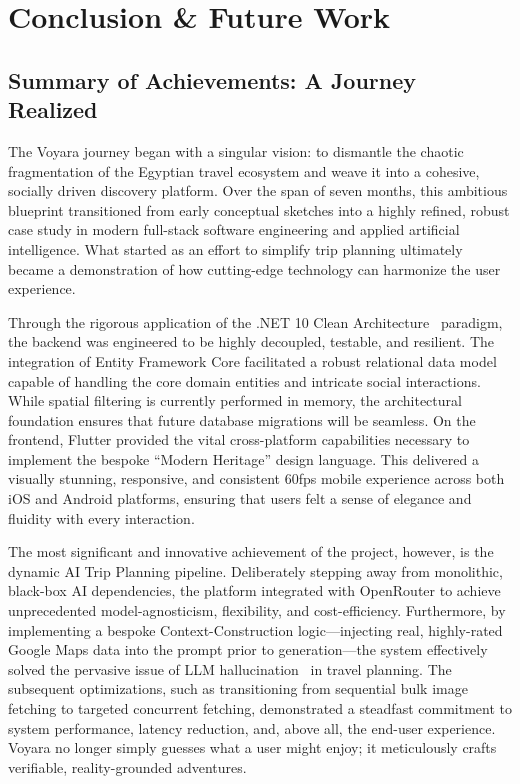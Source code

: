 \chapter{Conclusion \& Future Work}

\section{Summary of Achievements: A Journey Realized}
The Voyara journey began with a singular vision: to dismantle the chaotic fragmentation of the Egyptian travel ecosystem and weave it into a cohesive, socially driven discovery platform. Over the span of seven months, this ambitious blueprint transitioned from early conceptual sketches into a highly refined, robust case study in modern full-stack software engineering and applied artificial intelligence. What started as an effort to simplify trip planning ultimately became a demonstration of how cutting-edge technology can harmonize the user experience.

Through the rigorous application of the .NET 10 Clean Architecture~\cite{martin2017clean} paradigm, the backend was engineered to be highly decoupled, testable, and resilient. The integration of Entity Framework Core facilitated a robust relational data model capable of handling the core domain entities and intricate social interactions. While spatial filtering is currently performed in memory, the architectural foundation ensures that future database migrations will be seamless. On the frontend, Flutter provided the vital cross-platform capabilities necessary to implement the bespoke ``Modern Heritage'' design language. This delivered a visually stunning, responsive, and consistent 60fps mobile experience across both iOS and Android platforms, ensuring that users felt a sense of elegance and fluidity with every interaction.

The most significant and innovative achievement of the project, however, is the dynamic AI Trip Planning pipeline. Deliberately stepping away from monolithic, black-box AI dependencies, the platform integrated with OpenRouter to achieve unprecedented model-agnosticism, flexibility, and cost-efficiency. Furthermore, by implementing a bespoke Context-Construction logic---injecting real, highly-rated Google Maps data into the prompt prior to generation---the system effectively solved the pervasive issue of LLM hallucination~\cite{ji2023survey} in travel planning. The subsequent optimizations, such as transitioning from sequential bulk image fetching to targeted concurrent fetching, demonstrated a steadfast commitment to system performance, latency reduction, and, above all, the end-user experience. Voyara no longer simply guesses what a user might enjoy; it meticulously crafts verifiable, reality-grounded adventures.

